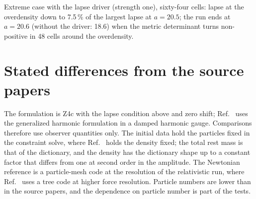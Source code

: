 \documentclass[aps,prd,twocolumn,10pt,superscriptaddress,nofootinbib,longbibliography,floatfix]{revtex4-2}
\begin{document}
Extreme case with the lapse driver (strength one), sixty-four cells: lapse at the overdensity down to 7.5\,\% of the largest lapse at $a = 20.5$; the run ends at $a = 20.6$ (without the driver: 18.6) when the metric determinant turns non-positive in 48 cells around the overdensity.

\section{Stated differences from the source papers}\label{app:differences}

The formulation is Z4c with the lapse condition above and zero shift; Ref.~\cite{East:2019chx} uses the generalized harmonic formulation in a damped harmonic gauge. Comparisons therefore use observer quantities only. The initial data hold the particles fixed in the constraint solve, where Ref.~\cite{East:2017qmk} holds the density fixed; the total rest mass is that of the dictionary, and the density has the dictionary shape up to a constant factor that differs from one at second order in the amplitude. The Newtonian reference is a particle-mesh code at the resolution of the relativistic run, where Ref.~\cite{East:2019chx} uses a tree code at higher force resolution. Particle numbers are lower than in the source papers, and the dependence on particle number is part of the tests.


\end{document}
